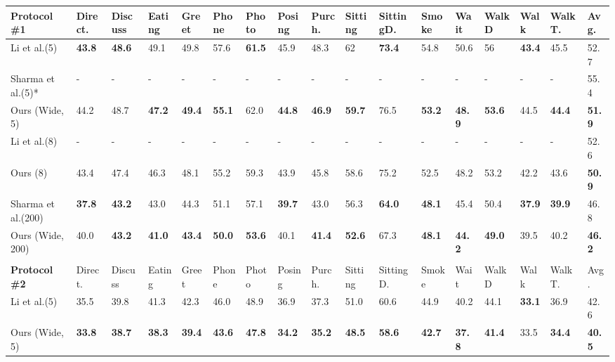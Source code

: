 \begin{table}
\scriptsize
\setlength{\tabcolsep}{1pt}
\begin{tabular}{lllllllllllllllll}
\textbf{Protocol   \#1} & Direct. & Discuss & Eating & Greet & Phone & Photo & Posing & Purch. & Sitting & SittingD. & Smoke & Wait & WalkD & Walk & WalkT. & Avg. \\ \hline
Li et al.\cite{Li_2019_CVPR}(5) & \textbf{43.8} & \textbf{48.6} & 49.1 & 49.8 & 57.6 & \textbf{61.5} & 45.9 & 48.3 & 62 & \textbf{73.4} & 54.8 & 50.6 & 56 & \textbf{43.4} & 45.5 & 52.7 \\
Sharma et al.\cite{Sharma_2019_ICCV}(5)* & - & - & - & - & - & - & - & - & - & - & - & - & - & - & - & 55.4 \\
Ours (Wide, 5) & 44.2 & 48.7 & \textbf{47.2} & \textbf{49.4} & \textbf{55.1} & 62.0 & \textbf{44.8} & \textbf{46.9} & \textbf{59.7} & 76.5 & \textbf{53.2} & \textbf{48.9} & \textbf{53.6} & 44.5 & \textbf{44.4} & \textbf{51.9} \\ \hline
Li et al.\cite{Li_2019_CVPR}(8) & - & - & - & - & - & - & - & - & - & - & - & - & - & - & - & 52.6 \\
Ours (8) & 43.4 & 47.4 & 46.3 & 48.1 & 55.2 & 59.3 & 43.9 & 45.8 & 58.6 & 75.2 & 52.5 & 48.2 & 53.2 & 42.2 & 43.6 & \textbf{50.9} \\ \hline
Sharma et al.\cite{Sharma_2019_ICCV}(200) & \textbf{37.8} & \textbf{43.2} & 43.0 & 44.3 & 51.1 & 57.1 & \textbf{39.7} & 43.0 & 56.3 & \textbf{64.0} & \textbf{48.1} & 45.4 & 50.4 & \textbf{37.9} & \textbf{39.9} & 46.8 \\
Ours (Wide, 200) & 40.0 & \textbf{43.2} & \textbf{41.0} & \textbf{43.4} & \textbf{50.0} & \textbf{53.6} & 40.1 & \textbf{41.4} & \textbf{52.6} & 67.3 & \textbf{48.1} & \textbf{44.2} & \textbf{49.0} & 39.5 & 40.2 & \textbf{46.2} \\
 &  &  &  &  &  &  &  &  &  &  &  &  &  &  &  &  \\
\textbf{Protocol \#2} & Direct. & Discuss & Eating & Greet & Phone & Photo & Posing & Purch. & Sitting & SittingD. & Smoke & Wait & WalkD & Walk & WalkT. & Avg. \\ \hline
Li et al.\cite{Li_2019_CVPR}(5) & 35.5 & 39.8 & 41.3 & 42.3 & 46.0 & 48.9 & 36.9 & 37.3 & 51.0 & 60.6 & 44.9 & 40.2 & 44.1 & \textbf{33.1} & 36.9 & 42.6 \\
Ours (Wide, 5) & \textbf{33.8} & \textbf{38.7} & \textbf{38.3} & \textbf{39.4} & \textbf{43.6} & \textbf{47.8} & \textbf{34.2} & \textbf{35.2} & \textbf{48.5} & \textbf{58.6} & \textbf{42.7} & \textbf{37.8} & \textbf{41.4} & 33.5 & \textbf{34.4} & \textbf{40.5} \\ \hline

\end{tabular}
\end{table}
